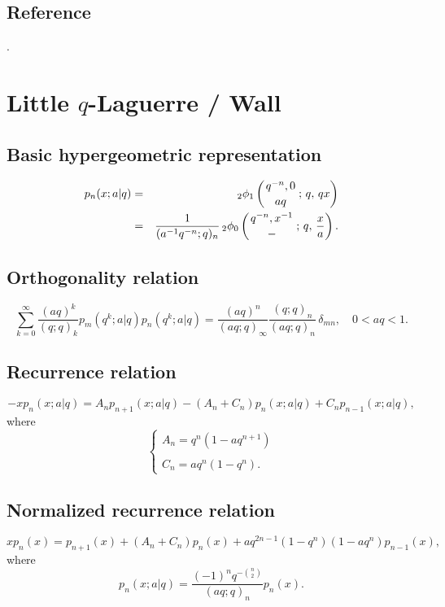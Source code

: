 \documentclass[envcountchap,graybox]{svmono}
\newcommand{\qhyp}[5]{\mbox{}_{#1}{\phi}_{#2}
\left(\genfrac{}{}{0pt}{}{#3}{#4}\,;\,q,\,#5\right)}
\begin{document}
\subsection*{Reference}
\cite{AskeyWilson85}.


\section{Little $q$-Laguerre / Wall}
\par\setcounter{equation}{0}

\subsection*{Basic hypergeometric representation}
\begin{eqnarray}
\label{DefLittleqLaguerre}
p_n(x;a|q)&=&\qhyp{2}{1}{q^{-n},0}{aq}{qx}\\
&=&\frac{1}{(a^{-1}q^{-n};q)_n}\,\qhyp{2}{0}{q^{-n},x^{-1}}{-}{\frac{x}{a}}.\nonumber
\end{eqnarray}

\newpage

\subsection*{Orthogonality relation}
\begin{equation}
\label{OrtLittleqLaguerre}
\sum_{k=0}^{\infty}\frac{(aq)^k}{(q;q)_k}p_m(q^k;a|q)p_n(q^k;a|q)=
\frac{(aq)^n}{(aq;q)_{\infty}}\frac{(q;q)_n}{(aq;q)_n}\,\delta_{mn},\quad 0<aq<1.
\end{equation}

\subsection*{Recurrence relation}
\begin{equation}
\label{RecLittleqLaguerre}
-xp_n(x;a|q)=A_np_{n+1}(x;a|q)-\left(A_n+C_n\right)p_n(x;a|q)+C_np_{n-1}(x;a|q),
\end{equation}
where
$$\left\{\begin{array}{l}A_n=q^n(1-aq^{n+1})\\
\\
C_n=aq^n(1-q^n).\end{array}\right.$$

\subsection*{Normalized recurrence relation}
\begin{equation}
\label{NormRecLittleqLaguerre}
xp_n(x)=p_{n+1}(x)+(A_n+C_n)p_n(x)+aq^{2n-1}(1-q^n)(1-aq^n)p_{n-1}(x),
\end{equation}
where
$$p_n(x;a|q)=\frac{(-1)^nq^{-\binom{n}{2}}}{(aq;q)_n}p_n(x).$$
\end{document}
